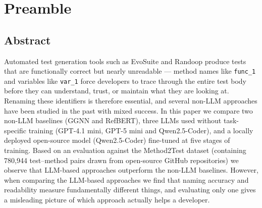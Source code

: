 
\setcounter{chapter}{-1}

\chapter{Preamble}

\section*{Abstract}

Automated test generation tools such as EvoSuite and Randoop produce tests that are functionally correct but nearly unreadable --- method names like \texttt{func\_1} and variables like \texttt{var\_1} force developers to trace through the entire test body before they can understand, trust, or maintain what they are looking at.
Renaming these identifiers is therefore essential, and several non-LLM approaches have been studied in the past with mixed success.
In this paper we compare two non-LLM baselines (GGNN and RefBERT), three LLMs used without task-specific training (GPT-4.1 mini, GPT-5 mini and Qwen2.5-Coder), and a locally deployed open-source model (Qwen2.5-Coder) fine-tuned at five stages of training.
Based on an evaluation against the Method2Test dataset (containing 780,944 test--method pairs drawn from open-source GitHub repositories) we observe that LLM-based approaches outperform the non-LLM baselines.
However, when comparing the LLM-based approaches we find that naming accuracy and readability measure fundamentally different things, and evaluating only one gives a misleading picture of which approach actually helps a developer.
